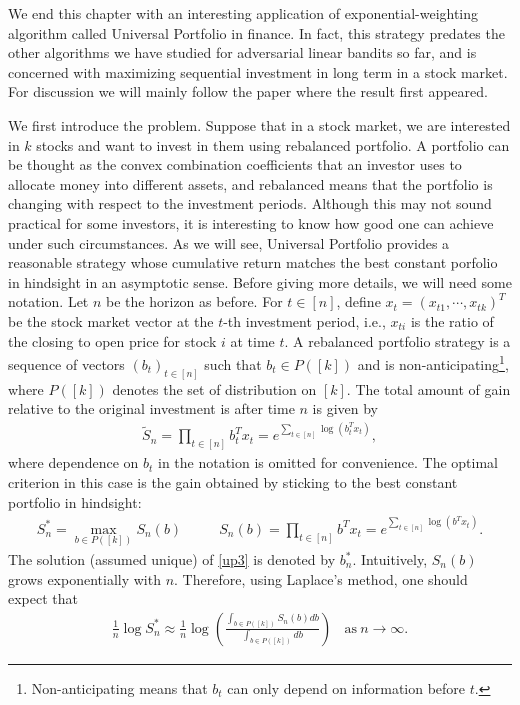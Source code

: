 \documentclass[letterpaper,11pt,openright,openany]{book}
\numberwithin{equation}{section}
\theoremstyle{plain}
\theoremstyle{definition}
\begin{document}
We end this chapter with an interesting application of exponential-weighting algorithm called Universal Portfolio in finance. 
In fact, this strategy predates the other algorithms we have studied for adversarial linear bandits so far, and is concerned with maximizing sequential investment in long term in a stock market. 
For discussion we will mainly follow the paper \cite{cover2011universal} where the result first appeared.

We first introduce the problem. Suppose that in a stock market, we are interested in $k$ stocks and want to invest in them using rebalanced portfolio. A portfolio can be thought as the convex combination coefficients that an investor uses to allocate money into different assets, and rebalanced means that the portfolio is changing with respect to the investment periods.  Although this may not sound practical for some investors, it is interesting to know how good one can achieve under such circumstances. As we will see, Universal Portfolio provides a reasonable strategy whose cumulative return matches the best constant porfolio in hindsight in an asymptotic sense. Before giving more details, we will need some notation. Let $n$ be the horizon as before. For $t\in [n]$, define $x_t = (x_{t1}, \cdots, x_{tk})^T$ be the stock market vector at the $t$-th investment period, i.e., $x_{ti}$ is the ratio of the closing to open price for stock $i$ at time $t$. A rebalanced portfolio strategy is a sequence of vectors $(b_t)_{t\in [n]}$ such that $b_t\in P([k])$ and is non-anticipating\footnote{Non-anticipating means that $b_t$ can only depend on information before $t$.}, where $P([k])$ denotes the set of distribution on $[k]$. The total amount of gain relative to the original investment is after time $n$ is given by
\begin{align*}
\tilde{S}_n = \prod_{t\in [n]}b_t^Tx_t=e^{\sum_{t\in [n]}\log(b_t^Tx_t)}, 
\end{align*}
where dependence on $b_t$ in the notation is omitted for convenience. The optimal criterion in this case is the gain obtained by sticking to the best constant portfolio in hindsight: 
\begin{align}
S_n^* = \max_{b\in P([k])}S_n(b)\ \ \ \ \ \ \ \ \ \ \ \ S_n(b)=\prod_{t\in [n]}b^Tx_t=e^{\sum_{t\in [n]}\log(b^Tx_t)}. \label{up3}
\end{align}
The solution (assumed unique) of \eqref{up3} is denoted by $b_n^*$. Intuitively, $S_n(b)$ grows exponentially with $n$. Therefore, using Laplace's method, one should expect that 
\begin{align}
\frac{1}{n}\log S_n^*\approx \frac{1}{n}\log \left(\frac{\int_{b\in P([k])}S_n(b)db}{\int_{b\in P([k])}db}\right)\ \ \ \ \text{as}\ n\to\infty. \label{up1}
\end{align}
\end{document}
